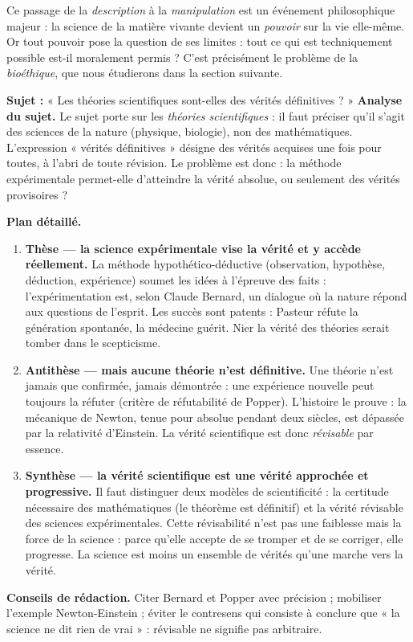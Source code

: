 \documentclass[11pt]{article}
\begin{document}
Ce passage de la \emph{description} à la \emph{manipulation} est un événement philosophique majeur : la science de la matière vivante devient un \emph{pouvoir} sur la vie elle-même. Or tout pouvoir pose la question de ses limites : tout ce qui est techniquement possible est-il moralement permis ? C'est précisément le problème de la \emph{bioéthique}, que nous étudierons dans la section suivante.

\begin{exoresolu}
\textbf{Sujet :} « Les théories scientifiques sont-elles des vérités définitives ? »
\tcblower
\textbf{Analyse du sujet.} Le sujet porte sur les \emph{théories scientifiques} : il faut préciser qu'il s'agit des sciences de la nature (physique, biologie), non des mathématiques. L'expression « vérités définitives » désigne des vérités acquises une fois pour toutes, à l'abri de toute révision. Le problème est donc : la méthode expérimentale permet-elle d'atteindre la vérité absolue, ou seulement des vérités provisoires ?

\textbf{Plan détaillé.}
\begin{enumerate}
\item \textbf{Thèse — la science expérimentale vise la vérité et y accède réellement.} La méthode hypothético-déductive (observation, hypothèse, déduction, expérience) soumet les idées à l'épreuve des faits : l'expérimentation est, selon Claude Bernard, un dialogue où la nature répond aux questions de l'esprit. Les succès sont patents : Pasteur réfute la génération spontanée, la médecine guérit. Nier la vérité des théories serait tomber dans le scepticisme.
\item \textbf{Antithèse — mais aucune théorie n'est définitive.} Une théorie n'est jamais que confirmée, jamais démontrée : une expérience nouvelle peut toujours la réfuter (critère de réfutabilité de Popper). L'histoire le prouve : la mécanique de Newton, tenue pour absolue pendant deux siècles, est dépassée par la relativité d'Einstein. La vérité scientifique est donc \emph{révisable} par essence.
\item \textbf{Synthèse — la vérité scientifique est une vérité approchée et progressive.} Il faut distinguer deux modèles de scientificité : la certitude nécessaire des mathématiques (le théorème est définitif) et la vérité révisable des sciences expérimentales. Cette révisabilité n'est pas une faiblesse mais la force de la science : parce qu'elle accepte de se tromper et de se corriger, elle progresse. La science est moins un ensemble de vérités qu'une marche vers la vérité.
\end{enumerate}

\textbf{Conseils de rédaction.} Citer Bernard et Popper avec précision ; mobiliser l'exemple Newton-Einstein ; éviter le contresens qui consiste à conclure que « la science ne dit rien de vrai » : révisable ne signifie pas arbitraire.
\end{exoresolu}
\end{document}
